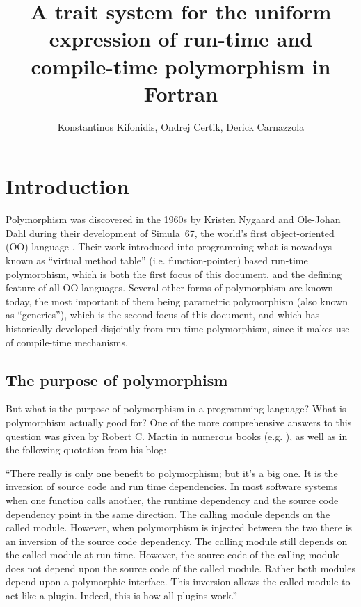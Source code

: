 \documentclass[11pt,oneside]{article}
\begin{document}
\title{A trait system for the uniform expression of run-time
       and compile-time polymorphism in Fortran}

\author{Konstantinos Kifonidis, Ondrej Certik, Derick Carnazzola}

\maketitle


\section{Introduction}

Polymorphism was discovered in the 1960s by Kristen Nygaard and
Ole-Johan Dahl during their development of Simula~67, the world's
first object-oriented (OO) language \cite{Dahl_04}. Their work
introduced into programming what is nowadays known as ``virtual method
table'' (i.e. function-pointer) based run-time polymorphism, which is
both the first focus of this document, and the defining feature of all
OO languages. Several other forms of polymorphism are known today, the
most important of them being parametric polymorphism
\cite{Cardelli_Wegner_85} (also known as ``generics''), which is the
second focus of this document, and which has historically developed
disjointly from run-time polymorphism, since it makes use of
compile-time mechanisms.


\subsection{The purpose of polymorphism}

But what is the purpose of polymorphism in a programming language?
What is polymorphism actually good for? One of the more comprehensive
answers to this question was given by Robert C. Martin in numerous
books (e.g. \cite{Martin_17}), as well as in the following quotation
from his blog:

\begin{displayquote}
``There really is only one benefit to polymorphism; but it's a big
  one. It is the inversion of source code and run time
  dependencies. In most software systems when one function calls
  another, the runtime dependency and the source code dependency point
  in the same direction. The calling module depends on the called
  module. However, when polymorphism is injected between the two there
  is an inversion of the source code dependency. The calling module
  still depends on the called module at run time. However, the source
  code of the calling module does not depend upon the source code of
  the called module. Rather both modules depend upon a polymorphic
  interface. This inversion allows the called module to act like a
  plugin. Indeed, this is how all plugins work.''
\end{displayquote}
\end{document}
